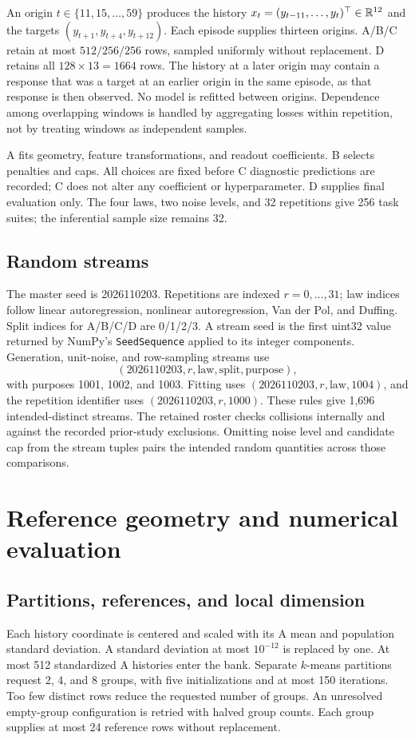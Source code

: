 An origin $t\in\{11,15,\ldots,59\}$ produces the history $x_t=(y_{t-11},\ldots,y_t)^\top\in\mathbb R^{12}$ and the targets $(y_{t+1},y_{t+4},y_{t+12})$. Each episode supplies thirteen origins. A/B/C retain at most $512/256/256$ rows, sampled uniformly without replacement. D retains all $128\times13=1664$ rows. The history at a later origin may contain a response that was a target at an earlier origin in the same episode, as that response is then observed. No model is refitted between origins. Dependence among overlapping windows is handled by aggregating losses within repetition, not by treating windows as independent samples.

A fits geometry, feature transformations, and readout coefficients. B selects penalties and caps. All choices are fixed before C diagnostic predictions are recorded; C does not alter any coefficient or hyperparameter. D supplies final evaluation only. The four laws, two noise levels, and 32 repetitions give 256 task suites; the inferential sample size remains 32.

\subsection{Random streams}
The master seed is 2026110203. Repetitions are indexed $r=0,\ldots,31$; law indices follow linear autoregression, nonlinear autoregression, Van der Pol, and Duffing. Split indices for A/B/C/D are 0/1/2/3. A stream seed is the first uint32 value returned by NumPy's \texttt{SeedSequence} applied to its integer components. Generation, unit-noise, and row-sampling streams use
\[
 (2026110203,r,\mathrm{law},\mathrm{split},\mathrm{purpose}),
\]
with purposes 1001, 1002, and 1003. Fitting uses $(2026110203,r,\mathrm{law},1004)$, and the repetition identifier uses $(2026110203,r,1000)$. These rules give 1,696 intended-distinct streams. The retained roster checks collisions internally and against the recorded prior-study exclusions. Omitting noise level and candidate cap from the stream tuples pairs the intended random quantities across those comparisons.

\section{Reference geometry and numerical evaluation}\label{supp:geometry}
\subsection{Partitions, references, and local dimension}
Each history coordinate is centered and scaled with its A mean and population standard deviation. A standard deviation at most $10^{-12}$ is replaced by one. At most 512 standardized A histories enter the bank. Separate $k$-means partitions request 2, 4, and 8 groups, with five initializations and at most 150 iterations. Too few distinct rows reduce the requested number of groups. An unresolved empty-group configuration is retried with halved group counts. Each group supplies at most 24 reference rows without replacement.

